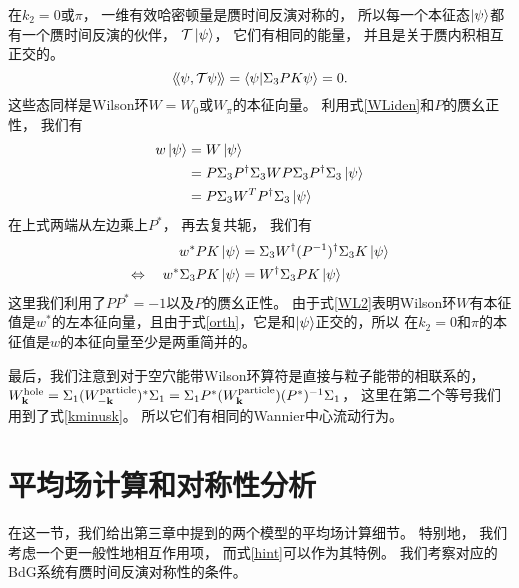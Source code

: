 在$k_2=0$或$\pi$，
一维有效哈密顿量是赝时间反演对称的，
所以每一个本征态$\ket{\psi}$都有一个赝时间反演的伙伴，
$\mathcal T\ket{\psi}$，
它们有相同的能量，
并且是关于赝内积相互正交的。
\begin{equation}\label{orth}
	\langle\!\langle \psi,\mathcal T \psi \rangle\!\rangle=\braket{\psi}{\Sigma_3 PK\psi}=0.
\end{equation}
这些态同样是Wilson环$W=W_{0}$或$W_\pi$的本征向量。
利用式\eqref{WLiden}和$P$的赝幺正性，
我们有
\begin{equation*}
	\begin{split}
		w\ket{\psi} &= W\ket{\psi}\\
		&= P\Sigma_3P^\dagger \Sigma_3 W P\Sigma_3P^\dagger \Sigma_3\ket{\psi}\\
		&= P\Sigma_3 W^T P^\dagger \Sigma_3 \ket{\psi}
	\end{split}
\end{equation*}
在上式两端从左边乘上$P^*$，
再去复共轭，
我们有
\begin{equation}\label{WL2}
	\begin{split}
		w^*PK\ket{\psi} &= \Sigma_3 W^\dagger (P^{-1})^\dagger \Sigma_3 K \ket{\psi}\\
		\Leftrightarrow\quad w^* \Sigma_3 PK\ket{\psi} & = W^\dagger \Sigma_3 PK\ket{\psi}
	\end{split}
\end{equation}
这里我们利用了$PP^*=-1$以及$P$的赝幺正性。
由于式\eqref{WL2}表明Wilson环$W$有本征值是$w^*$的左本征向量，且由于式\eqref{orth}，它是和$\ket{\psi}$正交的，所以 在$k_2=0$和$\pi$的本征值是$w$的本征向量至少是两重简并的。

最后，我们注意到对于空穴能带Wilson环算符是直接与粒子能带的相联系的，
$W^{\textnormal{hole}}_{\vb k}=\Sigma_1 (W_{-\vb k}^{\textnormal{particle}})^*\Sigma_1=\Sigma_1P^* (W_{\vb k}^{\textnormal{particle}})(P^{*})^{-1} \Sigma_1$，
这里在第二个等号我们用到了式\eqref{kminusk}。
所以它们有相同的Wannier中心流动行为。 

\section{平均场计算和对称性分析}\label{mfs}
在这一节，我们给出第三章中提到的两个模型的平均场计算细节。
特别地，
我们考虑一个更一般性地相互作用项，
而式\eqref{hint}可以作为其特例。
我们考察对应的BdG系统有赝时间反演对称性的条件。
